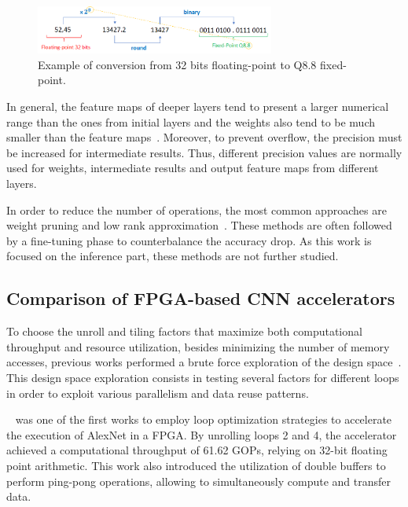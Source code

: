 \vspace{-0.5cm}
\begin{figure}[!htb]
  \centering
  \includegraphics[width=0.7\textwidth]{Figures/fp_conv.png}
  \caption{Example of conversion from 32 bits floating-point to Q8.8 fixed-point.}
  \label{fig:fp_conv}
\end{figure}

In general, the feature maps of deeper layers tend to present a larger numerical range than the ones from initial layers and the weights also tend to be much smaller than the feature maps~\cite{Guo:dnn_survey}. Moreover, to prevent overflow, the precision must be increased for intermediate results. Thus, different precision values are normally used for weights, intermediate results and output feature maps from different layers. 

In order to reduce the number of operations, the most common approaches are weight pruning and low rank approximation~\cite{Abdelouahab:dnn_survey}. These methods are often followed by a fine-tuning phase to counterbalance the accuracy drop. As this work is focused on the inference part, these methods are not further studied.

\subsection{Comparison of FPGA-based CNN accelerators}
\label{subsection:comparison_fpga_acc}

To choose the unroll and tiling factors that maximize both computational throughput and resource utilization, besides minimizing the number of memory accesses, previous works performed a brute force exploration of the design space~\cite{Abdelouahab:dnn_survey}. This design space exploration consists in testing several factors for different loops in order to exploit various parallelism and data reuse patterns.

~\cite{zhang:fpga_acc} was one of the first works to employ loop optimization strategies to accelerate the execution of AlexNet in a FPGA. By unrolling loops 2 and 4, the accelerator achieved a computational throughput of 61.62 GOPs, relying on 32-bit floating point arithmetic. This work also introduced the utilization of double buffers to perform ping-pong operations, allowing to simultaneously compute and transfer data.

